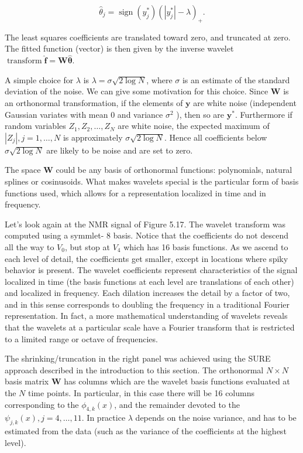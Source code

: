 \documentclass[10pt]{article}
\begin{document}
\begin{equation*}
\hat{\theta}_{j}=\operatorname{sign}\left(y_{j}^{*}\right)\left(\left|y_{j}^{*}\right|-\lambda\right)_{+} . \tag{5.69}
\end{equation*}


The least squares coefficients are translated toward zero, and truncated at zero. The fitted function (vector) is then given by the inverse wavelet $\operatorname{transform} \hat{\mathbf{f}}=\mathbf{W} \hat{\boldsymbol{\theta}}$.

A simple choice for $\lambda$ is $\lambda=\sigma \sqrt{2 \log N}$, where $\sigma$ is an estimate of the standard deviation of the noise. We can give some motivation for this choice. Since $\mathbf{W}$ is an orthonormal transformation, if the elements of $\mathbf{y}$ are white noise (independent Gaussian variates with mean 0 and variance $\sigma^{2}$ ), then so are $\mathbf{y}^{*}$. Furthermore if random variables $Z_{1}, Z_{2}, \ldots, Z_{N}$ are white noise, the expected maximum of $\left|Z_{j}\right|, j=1, \ldots, N$ is approximately $\sigma \sqrt{2 \log N}$. Hence all coefficients below $\sigma \sqrt{2 \log N}$ are likely to be noise and are set to zero.

The space $\mathbf{W}$ could be any basis of orthonormal functions: polynomials, natural splines or cosinusoids. What makes wavelets special is the particular form of basis functions used, which allows for a representation localized in time and in frequency.

Let's look again at the NMR signal of Figure 5.17. The wavelet transform was computed using a symmlet- 8 basis. Notice that the coefficients do not descend all the way to $V_{0}$, but stop at $V_{4}$ which has 16 basis functions. As we ascend to each level of detail, the coefficients get smaller, except in locations where spiky behavior is present. The wavelet coefficients represent characteristics of the signal localized in time (the basis functions at each level are translations of each other) and localized in frequency. Each dilation increases the detail by a factor of two, and in this sense corresponds to doubling the frequency in a traditional Fourier representation. In fact, a more mathematical understanding of wavelets reveals that the wavelets at a particular scale have a Fourier transform that is restricted to a limited range or octave of frequencies.

The shrinking/truncation in the right panel was achieved using the SURE approach described in the introduction to this section. The orthonormal $N \times N$ basis matrix $\mathbf{W}$ has columns which are the wavelet basis functions evaluated at the $N$ time points. In particular, in this case there will be 16 columns corresponding to the $\phi_{4, k}(x)$, and the remainder devoted to the $\psi_{j, k}(x), j=4, \ldots, 11$. In practice $\lambda$ depends on the noise variance, and has to be estimated from the data (such as the variance of the coefficients at the highest level).
\end{document}
